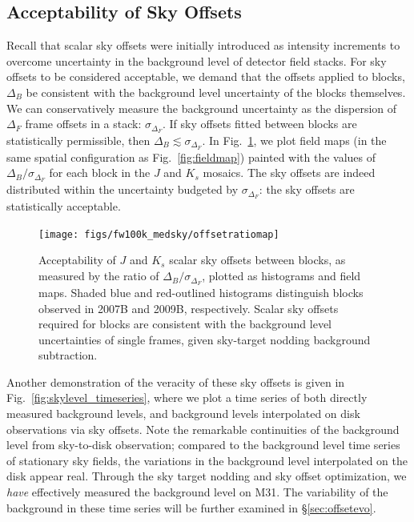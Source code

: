 \documentclass[iop]{emulateapj}
\newcommand{\Fig}[1]{Fig.~\ref{fig:#1}}  %
\newcommand{\Sec}[1]{\S\ref{sec:#1}}  %
\begin{document}
\subsection{Acceptability of Sky Offsets}
\label{sec:offset_acceptability}

Recall that scalar sky offsets were initially introduced as intensity increments to overcome uncertainty in the background level of detector field stacks.
For sky offsets to be considered acceptable, we demand that the offsets applied to blocks, $\Delta_B$ be consistent with the background level uncertainty of the blocks themselves.
We can conservatively measure the background uncertainty as the dispersion of $\Delta_F$ frame offsets in a stack: $\sigma_{\Delta_F}$.
If sky offsets fitted between blocks are statistically permissible, then $\Delta_B \lesssim \sigma_{\Delta_F}$.
In \Fig{offset_ratio_map}, we plot field maps (in the same spatial configuration as \Fig{fieldmap}) painted with the values of $\Delta_B / \sigma_{\Delta_F}$ for each block in the $J$ and $K_s$ mosaics.
The sky offsets are indeed distributed within the uncertainty budgeted by $\sigma_{\Delta_F}$: the sky offsets are statistically acceptable.

\begin{figure}[t]
\centering
\texttt{[image: figs/fw100k\_medsky/offsetratiomap]}
\caption{Acceptability of $J$ and $K_s$ scalar sky offsets between blocks, as measured by the ratio of $\Delta_B/\sigma_{\Delta_F}$, plotted as histograms and field maps. Shaded blue and red-outlined histograms distinguish blocks observed in 2007B and 2009B, respectively. Scalar sky offsets required for blocks are consistent with the background level uncertainties of single frames, given sky-target nodding background subtraction.}
\label{fig:offset_ratio_map}
\end{figure}

Another demonstration of the veracity of these sky offsets is given in \Fig{skylevel_timeseries}, where we plot a time series of both directly measured background levels, and background levels interpolated on disk observations via sky offsets.
Note the remarkable continuities of the background level from sky-to-disk observation; compared to the background level time series of stationary sky fields, the variations in the background level interpolated on the disk appear real.
Through the sky target nodding and sky offset optimization, we \emph{have} effectively measured the background level on M31.
The variability of the background in these time series will be further examined in \Sec{offsetevo}.
\end{document}
